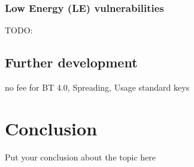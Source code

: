 \documentclass[12pt,a4paper]{article}
\begin{document}
\subsubsection{Low Energy (LE) vulnerabilities}
TODO: \cite{DBLP:conf/woot/Ryan13} \cite{DBLP:conf/greencom/XuZLMLCSTY13}

\subsection{Further development}
no fee for BT 4.0, Spreading, Usage standard keys

\section{Conclusion}
Put your conclusion about the topic here



{}

\end{document}
